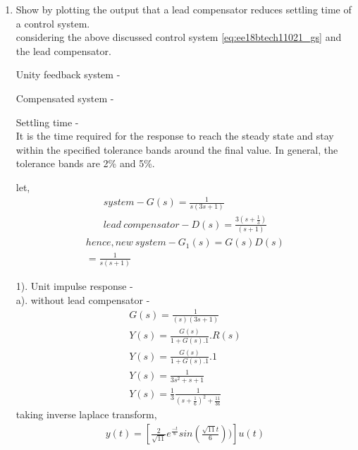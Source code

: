 \begin{enumerate}[label=\thesection.\arabic*.,ref=\thesection.\theenumi]
\item Show by plotting the output that a lead compensator reduces settling time of a control system.\\
\solution considering the above discussed control system \eqref{eq:ee18btech11021_gs} and the lead compensator.

Unity feedback system - 
\begin{figure}[h]
\begin{center}
\resizebox{\columnwidth}{!}{}
\end{center}
\end{figure}

Compensated system - 
\begin{figure}[h]
\begin{center}
\resizebox{\columnwidth}{!}{}
\end{center}
\end{figure}

Settling time - \\
It is the time required for the response to reach the steady state and stay within the specified tolerance bands around the final value. In general, the tolerance bands are 2\% and 5\%.

let,
\begin{align}
system-G(s) = \frac{1}{s(3s+1)}\\
lead\ compensator-D(s) = \frac{3(s+\frac{1}{3})}{(s+1)}
\end{align}
\begin{equation}
    \begin{split}
        hence, new\ system-G_{1}(s) = G(s)D(s)\\
        = \frac{1}{s(s+1)}
    \end{split}
\end{equation}

1). Unit impulse response - \\
a). without lead compensator - 
\begin{align}
G(s) = \frac{1}{(s)(3s+1)}\\
Y(s) = \frac{G(s)}{1+G(s).1}.R(s)\\
Y(s) = \frac{G(s)}{1+G(s).1}.1\\
Y(s) = \frac{1}{3s^2+s+1}\\
Y(s) = \frac{1}{3}\frac{1}{(s+\frac{1}{6})^2 + \frac{11}{36}}
\end{align}
taking inverse laplace transform, 
\begin{align}
y(t) = [\frac{2}{\sqrt{11}}e^{\frac{-t}{6}}sin(\frac{\sqrt{11}t}{6}))]u(t)
\end{align}


\end{enumerate}
